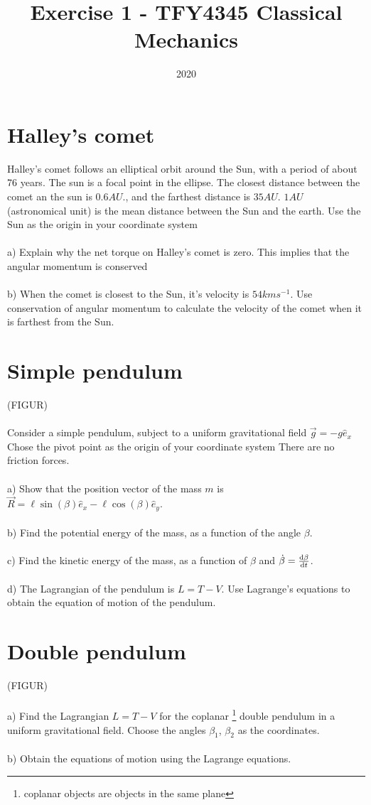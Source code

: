 \documentclass{article}
\title{Exercise 1 - TFY4345 Classical Mechanics}
\date{2020}
\begin{document}
    \maketitle
    \section{Halley's comet}
    Halley's comet follows an elliptical orbit around the Sun, with a period of about 76 years. The sun is a focal point in the ellipse. The closest distance between the comet an the sun is $0.6 \si{AU}$., and the farthest distance is $35 \si{AU}$. $1 \si{AU}$ (astronomical unit) is the mean distance between the Sun and the earth. Use the Sun as the origin in your coordinate system\\ \\
    a) Explain why the net torque on Halley's comet is zero. This implies that the angular momentum is conserved \\ \\
    b) When the comet is closest to the Sun, it's velocity is $54 \si{km} \si{s^{-1}}$. Use conservation of angular momentum to calculate the velocity of the comet when it is farthest from the Sun.

    \section{Simple pendulum}
    (FIGUR) \\ \\
    Consider a simple pendulum, subject to a uniform gravitational field $\vec{g} = -g \hat e_x$ Chose the pivot point as the origin of your coordinate system There are no friction forces. \\ \\
    a) Show that the position vector of the mass $m$ is $\vec R = \ell \sin(\beta) \hat e_x - \ell \cos(\beta) \hat e_y$.  \\ \\
    b) Find the potential energy of the mass, as a function of the angle $\beta$. \\ \\
    c) Find the kinetic energy of the mass, as a function of $\beta$ and $\dot \beta = \dv{\beta}{t}$. \\ \\
    d) The Lagrangian of the pendulum is $L = T - V$. Use Lagrange's equations to obtain the equation of motion of the pendulum.

    \section{Double pendulum}
    (FIGUR) \\ \\
    a) Find the Lagrangian $L = T - V$ for the coplanar \footnote{coplanar objects are objects in the same plane} double pendulum in a uniform gravitational field. Choose the angles $\beta_1$, $\beta_2$ as the coordinates. \\ \\
    b) Obtain the equations of motion using the Lagrange equations.
\end{document}
